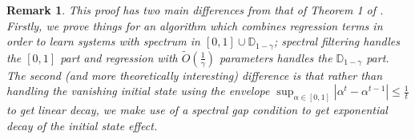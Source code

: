 \documentclass[11pt]{article}
\newtheorem{remark}[theorem]{Remark}
\numberwithin{equation}{section}
\begin{document}
\begin{remark}
\label{remark:spectralfilteringproof}
This proof has two main differences from that of Theorem 1 of \cite{hazan2017learning}. Firstly, we prove things for an algorithm which combines regression terms in order to learn systems with spectrum in $[0, 1] \cup \mathbb{D}_{1-\gamma}$; spectral filtering handles the $[0, 1]$ part and regression with $\widetilde{O}\left(\frac{1}{\gamma}\right)$ parameters handles the $\mathbb{D}_{1-\gamma}$ part. The second (and more theoretically interesting) difference is that rather than handling the vanishing initial state using the envelope $\sup_{\alpha \in [0, 1]} |\alpha^t - \alpha^{t-1}| \leq \frac{1}{t}$ to get linear decay, we make use of a spectral gap condition to get exponential decay of the initial state effect. 
\end{remark}
\end{document}
